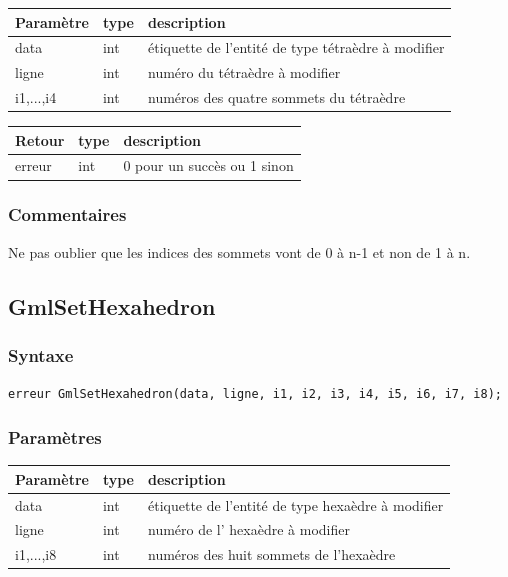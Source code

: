 \documentclass[a4paper,12pt]{article}
\begin{document}
\begin{tabular}{|m{2cm}|m{1.5cm}|m{10.5cm}|}
\hline
Paramètre  & type   & description \\
\hline
data       & int    & étiquette de l'entité de type tétraèdre à modifier \\
\hline
ligne      & int    & numéro du tétraèdre à modifier \\
\hline
i1,...,i4  & int    & numéros des quatre sommets du tétraèdre \\
\hline
\end{tabular}

\medskip

\begin{tabular}{|m{2cm}|m{1.5cm}|m{10.5cm}|}
\hline
Retour     & type   & description \\
\hline
erreur     & int    & 0 pour un succès ou 1 sinon \\
\hline
\end{tabular}
\subsubsection*{Commentaires}
Ne pas oublier que les indices des sommets vont de 0 à n-1 et non de 1 à n.


\subsection{GmlSetHexahedron}
\subsubsection*{Syntaxe}
{\tt erreur GmlSetHexahedron(data, ligne, i1, i2, i3, i4, i5, i6, i7, i8);}
\subsubsection*{Paramètres}

\begin{tabular}{|m{2cm}|m{1.5cm}|m{10.5cm}|}
\hline
Paramètre  & type   & description \\
\hline
data       & int    & étiquette de l'entité de type hexaèdre à modifier \\
\hline
ligne      & int    & numéro de l’ hexaèdre à modifier \\
\hline
i1,...,i8  & int    & numéros des huit sommets de l’hexaèdre \\
\hline
\end{tabular}

\medskip
\end{document}
